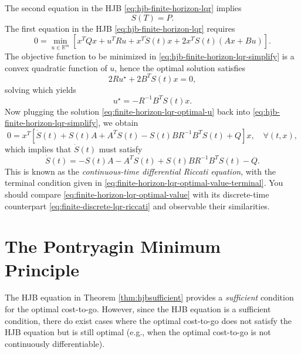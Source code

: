\documentclass[
]{book}
\theoremstyle{definition}
\theoremstyle{definition}
\theoremstyle{definition}
\theoremstyle{definition}
\theoremstyle{remark}
\begin{document}
The second equation in the HJB \eqref{eq:hjb-finite-horizon-lqr} implies
\begin{equation}
S(T) = P.
\label{eq:finite-horizon-lqr-optimal-value-terminal}
\end{equation}
The first equation in the HJB \eqref{eq:hjb-finite-horizon-lqr} requires
\begin{equation}
0 = \min_{u \in \mathbb{R}^m} \left[ x^T Q x + u^T R u + x^T \dot{S}(t) x + 2x^T S(t) (A x + Bu)  \right].
\label{eq:hjb-finite-horizon-lqr-simplify}
\end{equation}
The objective function to be minimized in \eqref{eq:hjb-finite-horizon-lqr-simplify} is a convex quadratic function of \(u\), hence the optimal solution satisfies
\[
2 R u^\star + 2B^T S(t) x = 0,
\]
solving which yields
\begin{equation}
u^\star = - R^{-1} B^T S(t) x.
\label{eq:finite-horizon-lqr-optimal-u}
\end{equation}
Now plugging the solution \eqref{eq:finite-horizon-lqr-optimal-u} back into \eqref{eq:hjb-finite-horizon-lqr-simplify}, we obtain
\[
0 = x^T \left[ \dot{S}(t) + S(t) A + A^T S(t) - S(t)B R^{-1} B^T S(t) + Q \right] x, \quad \forall (t,x),
\]
which implies that \(\dot{S}(t)\) must satisfy
\begin{equation}
\dot{S}(t) = - S(t) A - A^T S(t) + S(t) B R^{-1} B^T S(t) - Q.
\label{eq:finite-horizon-lqr-optimal-value}
\end{equation}
This is known as the \emph{continuous-time differential Riccati equation}, with the terminal condition given in \eqref{eq:finite-horizon-lqr-optimal-value-terminal}. You should compare \eqref{eq:finite-horizon-lqr-optimal-value} with its discrete-time counterpart \eqref{eq:finite-discrete-lqr-riccati} and observable their similarities.

\hypertarget{the-pontryagin-minimum-principle}{%
\section{The Pontryagin Minimum Principle}\label{the-pontryagin-minimum-principle}}

The HJB equation in Theorem \ref{thm:hjbsufficient} provides a \emph{sufficient} condition for the optimal cost-to-go. However, since the HJB equation is a sufficient condition, there do exist cases where the optimal cost-to-go does not satisfy the HJB equation but is still optimal (e.g., when the optimal cost-to-go is not continuously differentiable).
\end{document}
